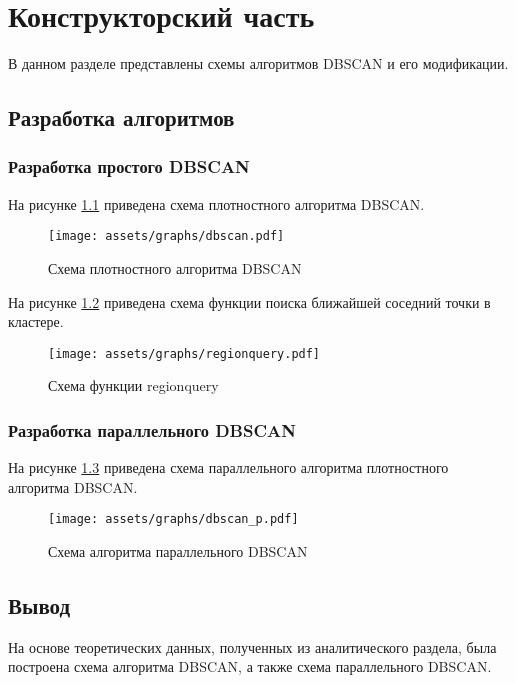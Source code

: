 \chapter{Конструкторский часть}

В данном разделе представлены схемы алгоритмов DBSCAN и его модификации.

\section{Разработка алгоритмов} %

\subsection{Разработка простого DBSCAN}
 
На рисунке \ref{fig:alg} приведена схема плотностного алгоритма DBSCAN.

\begin{figure}[ht!]
	\centering
	\texttt{[image: assets/graphs/dbscan.pdf]}
	\caption{Схема плотностного алгоритма DBSCAN}
	\label{fig:alg}
\end{figure}

На рисунке \ref{fig:alg2} приведена схема функции поиска ближайшей соседний точки в кластере.

\begin{figure}[ht!]
	\centering
	\texttt{[image: assets/graphs/regionquery.pdf]}
	\caption{Схема функции regionquery}
	\label{fig:alg2}
\end{figure}

\subsection{Разработка параллельного DBSCAN}

На рисунке \ref{fig:alg-p} приведена схема параллельного алгоритма плотностного алгоритма DBSCAN. %

\begin{figure}[ht!]
	\centering
	\texttt{[image: assets/graphs/dbscan\_p.pdf]}
	\caption{Схема алгоритма параллельного DBSCAN}
	\label{fig:alg-p}
\end{figure}



\section*{Вывод}

На основе теоретических данных, полученных из аналитического раздела, была построена схема алгоритма DBSCAN, а также схема параллельного DBSCAN.